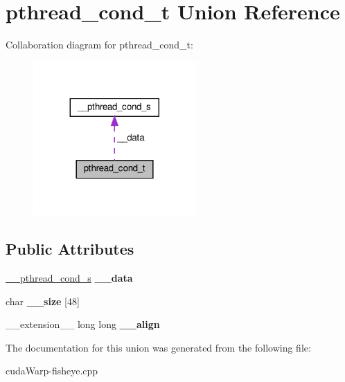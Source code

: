 \hypertarget{unionpthread__cond__t}{}\section{pthread\+\_\+cond\+\_\+t Union Reference}
\label{unionpthread__cond__t}


Collaboration diagram for pthread\+\_\+cond\+\_\+t\+:\nopagebreak
\begin{figure}[H]
\begin{center}
\leavevmode
\includegraphics[width=176pt]{unionpthread__cond__t__coll__graph}
\end{center}
\end{figure}
\subsection*{Public Attributes}
\begin{DoxyCompactItemize}
\item 
\hyperlink{struct____pthread__cond__s}{\+\_\+\+\_\+pthread\+\_\+cond\+\_\+s} {\bfseries \+\_\+\+\_\+data}\hypertarget{unionpthread__cond__t_a2b92e3765af1beacc8149573a701b6c0}{}\label{unionpthread__cond__t_a2b92e3765af1beacc8149573a701b6c0}

\item 
char {\bfseries \+\_\+\+\_\+size} \mbox{[}48\mbox{]}\hypertarget{unionpthread__cond__t_a20b7e9e2fd07d9e7b4e27dd45571972b}{}\label{unionpthread__cond__t_a20b7e9e2fd07d9e7b4e27dd45571972b}

\item 
\+\_\+\+\_\+extension\+\_\+\+\_\+ long long {\bfseries \+\_\+\+\_\+align}\hypertarget{unionpthread__cond__t_a8cbedb6b8dd649fb54ae68682400fef6}{}\label{unionpthread__cond__t_a8cbedb6b8dd649fb54ae68682400fef6}

\end{DoxyCompactItemize}


The documentation for this union was generated from the following file\+:\begin{DoxyCompactItemize}
\item 
cuda\+Warp-\/fisheye.\+cpp\end{DoxyCompactItemize}
